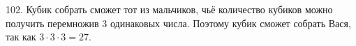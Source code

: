 102. Кубик собрать сможет тот из мальчиков, чьё количество кубиков можно получить перемножив 3 одинаковых числа. Поэтому кубик сможет собрать Вася, так как $3\cdot3\cdot3=27.$\\
